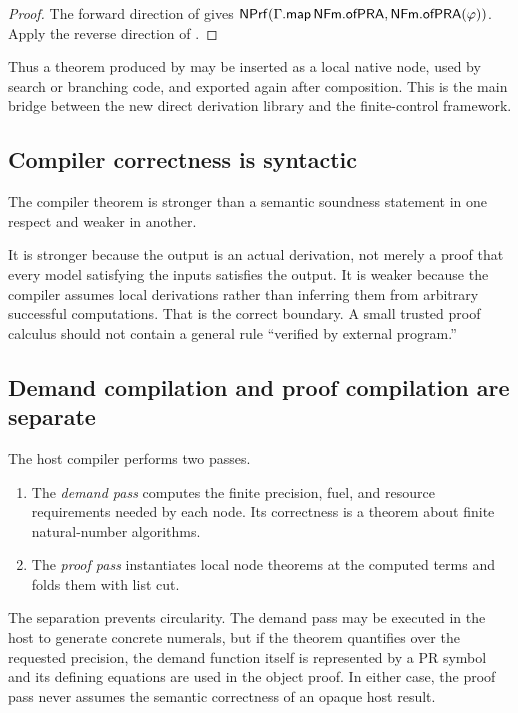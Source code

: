 \begin{proof}
The forward direction of  gives
\(\mathsf{NPrf}(\Gamma.\mathsf{map}\,\mathsf{NFm}.\mathsf{ofPRA},
\mathsf{NFm}.\mathsf{ofPRA}(\varphi))\).  Apply the reverse direction of
.
\end{proof}

Thus a theorem produced by  may be inserted as a local native
node, used by search or branching code, and exported again after composition.
This is the main bridge between the new direct derivation library and the
finite-control framework.

\subsection{Compiler correctness is syntactic}

The compiler theorem is stronger than a semantic soundness statement in one
respect and weaker in another.

It is stronger because the output is an actual derivation, not merely a proof
that every model satisfying the inputs satisfies the output.  It is weaker
because the compiler assumes local derivations rather than inferring them from
arbitrary successful computations.  That is the correct boundary.  A small
trusted proof calculus should not contain a general rule ``verified by external
program.''

\subsection{Demand compilation and proof compilation are separate}

The host compiler performs two passes.

\begin{enumerate}
\item The \emph{demand pass} computes the finite precision, fuel, and resource
requirements needed by each node.  Its correctness is a theorem about finite
natural-number algorithms.
\item The \emph{proof pass} instantiates local node theorems at the computed
terms and folds them with list cut.
\end{enumerate}

The separation prevents circularity.  The demand pass may be executed in the
host to generate concrete numerals, but if the theorem quantifies over the
requested precision, the demand function itself is represented by a PR symbol
and its defining equations are used in the object proof.  In either case, the
proof pass never assumes the semantic correctness of an opaque host result.

